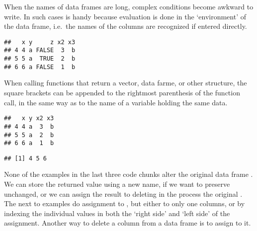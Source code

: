 \documentclass[paper=a4,10pt,div=17,headsepline,BCOR=12mm,twoside,open=right]{scrbook}\usepackage{knitr}
\begin{document}
When the names of data frames are long, complex conditions become awkward to write. In such cases  is handy because evaluation is done in the `environment' of the data frame, i.e.\ the names of the columns are recognized if entered directly.

\begin{knitrout}\footnotesize
{}\color{fgcolor}\begin{kframe}
\begin{alltt}
 \hlopt{>} \hlstd{)}
\end{alltt}
\begin{verbatim}
##   x y     z x2 x3
## 4 4 a FALSE  3  b
## 5 5 a  TRUE  2  b
## 6 6 a FALSE  1  b
\end{verbatim}
\end{kframe}
\end{knitrout}

When calling functions that return a vector, data farme, or other structure, the square brackets can be appended to the rightmost parenthesis of the function call, in the same way as to the name of a variable holding the same data.

\begin{knitrout}\footnotesize
{}\color{fgcolor}\begin{kframe}
\begin{alltt}
 \hlopt{>} \hlstd{)[ ,} \hlopt{-}\hlstd{]}
\end{alltt}
\begin{verbatim}
##   x y x2 x3
## 4 4 a  3  b
## 5 5 a  2  b
## 6 6 a  1  b
\end{verbatim}
\begin{alltt}
 \hlopt{>} \hlstd{)}\hlopt{$}
\end{alltt}
\begin{verbatim}
## [1] 4 5 6
\end{verbatim}
\end{kframe}
\end{knitrout}

None of the examples in the last three code chunks alter the original data frame . We can store the returned value using a new name, if we want to preserve  unchanged, or we can assign the result to  deleting in the process the original . The next to examples do assignment to , but either to only one columns, or by indexing the individual values in both the `right side' and `left side' of the assignment.
Another way to delete a column from a data frame is to assign  to it.
\end{document}
